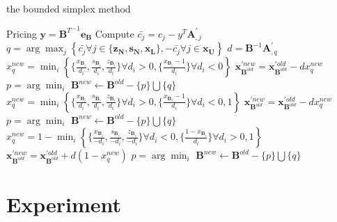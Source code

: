 \documentclass{llncs}
\begin{document}
\begin{algorithm}
\caption{the bounded simplex method}

Pricing $\mathbf{y} = {\mathbf{B}^T}^{-1}\mathbf{e_B}$\;
Compute $\bar{c_j} = c_j - y^T\mathbf{A}_{,j}^{'}$\;
{
    $q = \arg\max_{j} \left\{\bar{c_j} \forall j\in\{\mathbf{z_N}, \mathbf{s_N}, \mathbf{x_L}  \},-\bar{c_j} \forall j\in\mathbf{x_U}  \right\}$\;
    $d = \mathbf{B}^{-1}\mathbf{A}_{,q}^{'}$\;
    {
        $x_q^{new} = \min_i \left\{\{\frac{x_{\mathbf{B}_{i}}}{d_i}, \frac{s_{\mathbf{B}_{i}}}{d_i}, \frac{z_{\mathbf{B}_{i}}}{d_i}\} \forall d_i>0,\{\frac{x_{\mathbf{B}_{i}}-1}{d_i}\} \forall d_i<0\right\}$\;
        $\mathbf{x}_{\mathbf{B}^{old}}^{'new} = \mathbf{x}_{\mathbf{B}^{old}}^{'old} - dx_q^{new}$\;
        $p=\arg\min_{i}$\;
        $\mathbf{B}^{new} \leftarrow \mathbf{B}^{old} - \{p\} \bigcup \{q\}$\;
    }
    {
        $x_q^{new} = \min_i \left\{\{\frac{x_{\mathbf{B}_{i}}}{d_i}, \frac{s_{\mathbf{B}_{i}}}{d_i}, \frac{z_{\mathbf{B}_{i}}}{d_i}\} \forall d_i>0, \{\frac{x_{\mathbf{B}_{i}}-1}{d_i}\} \forall d_i<0, 1 \right\}$\;
        $\mathbf{x}_{\mathbf{B}^{old}}^{'new} = \mathbf{x}_{\mathbf{B}^{old}}^{'old} - dx_q^{new}$\; 
        {
            $p=\arg\min_{i}$\;
            $\mathbf{B}^{new} \leftarrow \mathbf{B}^{old} - \{p\} \bigcup \{q\}$\;
        }
    }
    {
        $x_q^{new} = 1 - \min_i \left\{\{\frac{x_{\mathbf{B}_{i}}}{-d_i}, \frac{s_{\mathbf{B}_{i}}}{-d_i}, \frac{z_{\mathbf{B}_{i}}}{-d_i}\} \forall d_i<0, \{\frac{1-x_{\mathbf{B}_{i}}}{d_i}\} \forall d_i>0, 1 \right\}$\;
        $\mathbf{x}_{\mathbf{B}^{old}}^{'new} = \mathbf{x}_{\mathbf{B}^{old}}^{'old} + d(1-x_q^{new})$\;
        {
            $p=\arg\min_{i}$\;
            $\mathbf{B}^{new} \leftarrow \mathbf{B}^{old} - \{p\} \bigcup \{q\}$\;
        }
    }
}

\end{algorithm}




\section{Experiment}\label{sec:experiment}
\end{document}
